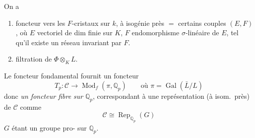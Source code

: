 \documentclass[11pt,a4paper]{article}
\begin{document}
On a



\begin{enumerate}
\item[a)] foncteur  vers les $F$-cristaux sur $k$, à
isogénie près $=$ certains couples $(E, F)$, où $E$ vectoriel de dim finie
sur $K$, $F$ endomorphisme $\sigma$-linéaire de $E$, tel qu'il existe un
réseau invariant par $F$.
\item[b)] filtration de $\Phi \otimes_K L$.
\end{enumerate}


Le foncteur fondamental fournit un foncteur
\[
T_p : \mathscr{C} \longrightarrow \operatorname{Mod}_f(\pi, \mathbb{Q}_p)
\qquad \text{où } \pi = \operatorname{Gal}(\bar{L}/L)
\]
donc \emph{un foncteur fibre sur} $\mathbb{Q}_p$, correspondant à une
représentation (à isom.\ près) de $\mathscr{C}$ comme
\[
\mathscr{C} \cong \operatorname{Rep}_{\mathbb{Q}_p}(G)
\]
$G$ étant un groupe pro-\struck{\ill{}} \ill{} sur $\mathbb{Q}_p$.
\end{document}
